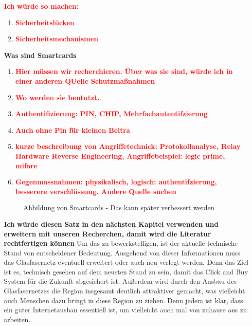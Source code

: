 \textbf{\textcolor{red}{Ich würde so machen:}}



\begin{enumerate}
    \item \textbf{\textcolor{red}{Sicherheitslücken}}
    \item \textbf{\textcolor{red}{Sicherheitsmechanismen}}
\end{enumerate}

\textbf{Was sind Smartcards}
\begin{enumerate}
    \item \textbf{\textcolor{red}{Hier müssen wir recherchieren. Über was sie sind, würde ich in einer anderen QUelle Schutzmaßnahmen}}
    \item \textbf{\textcolor{red}{Wo werden sie bentutzt. }}
    \item \textbf{\textcolor{red}{Authentifizierung: PIN, CHIP, Mehrfachautentifzierung}}
    \item \textbf{\textcolor{red}{Auch ohne Pin für kleinen Beitra}}
    \item \textbf{\textcolor{red}{kurze beschreibung von Angriffetechnick: Protokollanalyse, Relay   Hardware Reverse Engineering, Angriffebeispiel: legic prime, mifare  }}
    \item \textbf{\textcolor{red}{Gegenmassnahmen: physikalisch, logisch: authentifzierung, besserere verschlüssung. Andere Quelle suchen }}
\end{enumerate}


\vfill
\begin{figure}[htb]
    \caption{Abbildung von Smartcards - Das kann später verbessert werden}
    \label{fig:refmas:ASSS}
\end{figure}
\vfill



\vspace{2cm}
\textbf{Ich würde diesen Satz in den nächsten Kapitel verwenden und erweitern mit unseren Recherchen, damit wird 
die Literatur rechtfertigen können}
Um das zu bewerkstelligen, ist der aktuelle technische Stand von entscheidener Bedeutung. 
Ausgehend von dieser Informationen muss das Glasfasernetz eventuell erweitert oder auch neu verlegt werden.
Denn das Ziel ist es, technisch gesehen auf dem neusten Stand zu sein, damit das Click and Buy System für die Zukunft abgesichert ist.
Außerdem wird durch den Ausbau des Glasfasernetzes die Region insgesamt deutlich attraktiver gemacht, was vielleicht auch Menschen dazu bringt
in diese Region zu ziehen. Denn jedem ist klar, dass ein guter Internetausbau essentiell ist, um vielleicht auch mal von zuhause aus zu arbeiten.